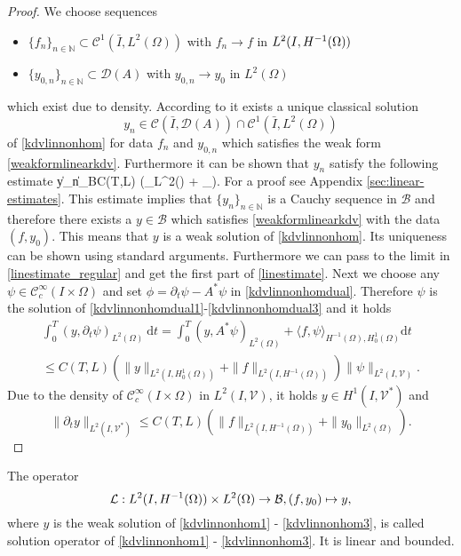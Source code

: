 \begin{proof}
We choose sequences
\begin{itemize}
  \item $\{f_n\}_{n\in\mathbb{N}}\subset\mathcal C^1(\bar I,L^2(\Omega))$ with $f_n\rightarrow f$ in $\Hm1$
  \item $\{y_{0,n}\}_{n\in\mathbb{N}}\subset\mathcal D(A)$ with $y_{0,n}\rightarrow y_0$ in $L^2(\Omega)$
\end{itemize}
which exist due to density. According to \cite[Part 2, Proposition 3.3]{bensoussan07} it exists a unique classical solution
\[y_n\in \mathcal C(\bar I,\mathcal D(A))\cap \mathcal C^1(\bar I,L^2(\Omega))\]
of \eqref{kdvlinnonhom} for data $f_n$ and $y_{0,n}$ which satisfies the weak form \eqref{weakformlinearkdv}. Furthermore it can be shown that $y_n$ satisfy the following estimate
\be
  \|y_n\|_{\mathcal B}\leq C(T,L) \left(_{L^{2}(\Omega)} + _{}\right).
  \label{linestimate_regular}
\ee
For a proof see Appendix \ref{sec:linear-estimates}.  This estimate implies that $\{y_n\}_{n\in \mathbb{N}}$ is a Cauchy sequence in $\mathcal B$ and therefore there exists a $y\in \mathcal B$ which satisfies \eqref{weakformlinearkdv} with the data $(f,y_0)$. This means that $y$ is a weak solution of \eqref{kdvlinnonhom}. Its uniqueness can be shown using standard arguments. Furthermore we can  pass to the limit in \eqref{linestimate_regular} and get the first part of \eqref{linestimate}. Next we choose any $\psi\in \mathcal C_c^{\infty}(I\times \Omega)$ and set $\phi=\partial_t\psi-A^*\psi$ in \eqref{kdvlinnonhomdual}. Therefore $\psi$ is the solution of \eqref{kdvlinnonhomdual1}-\eqref{kdvlinnonhomdual3} and it holds
\begin{multline*}
\int_0^T(y,\partial_t\psi)_{L^2(\Omega)}~\mathrm dt=\int_0^T(y,A^*\psi)_{L^2(\Omega)}+\langle f,\psi\rangle_{H^{-1}(\Omega),H^1_0(\Omega)}\mathrm dt\\
\leq C(T,L)\left(\|y\|_{L^2(I,H^1_0(\Omega))}+\|f\|_{L^2(I,H^{-1}(\Omega))}\right)\|\psi\|_{L^2(I,\mathcal V)}.
\end{multline*}
Due to the density of $\mathcal C_c^\infty(I\times \Omega)$ in $L^2(I,\mathcal V)$, it holds $y\in H^1(I,\mathcal V^*)$ and
\[\|\partial_t y\|_{L^2(I,\mathcal V^*)}\leq C(T,L)\left(\|f\|_{L^2(I,H^{-1}(\Omega))}+\|y_0\|_{L^2(\Omega)}\right).\]
\qquad\end{proof}

\begin{definition}\label{rmklinearoperator}
{\color{red}
The operator
\[
\mathcal{L}:\Hm1\times L^2(\Omega)\rightarrow \mathcal{B},(f,y_0) \mapsto y,
\]
where $y$ is the weak solution of \eqref{kdvlinnonhom1} - \eqref{kdvlinnonhom3}, is called solution operator of \eqref{kdvlinnonhom1} - \eqref{kdvlinnonhom3}. It is linear and bounded.}
\end{definition}
